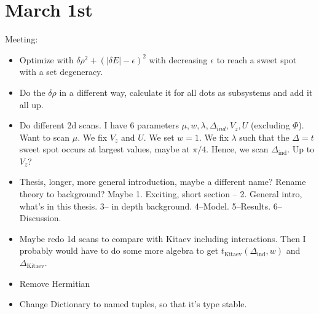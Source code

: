 \documentclass{article}
\begin{document}
\section*{March 1st}
Meeting:
\begin{itemize}
    \item Optimize with $\delta\rho^2 + (|\delta E| - \epsilon)^2$ with decreasing $\epsilon$ to reach a sweet spot with a set degeneracy.
    \item Do the $\delta\rho$ in a different way, calculate it for all dots as subsystems and add it all up.
    \item Do different 2d scans. I have 6 parameters $\mu, w, \lambda, \Delta_{ind}, V_z, U$ (excluding $\Phi$). Want to scan $\mu$. We fix $V_z$ and $U$. We set $w=1$. We fix $\lambda$ such that the $\Delta=t$ sweet spot occurs at largest values, maybe at $\pi/4$. Hence, we scan $\Delta_\text{ind}$. Up to $V_z$?
    \item Thesis, longer, more general introduction, maybe a different name? Rename theory to background? Maybe 1. Exciting, short section -- 2. General intro, what's in this thesis. 3-- in depth background. 4--Model. 5--Results. 6--Discussion.
    \item Maybe redo 1d scans to compare with Kitaev including interactions. Then I probably would have to do some more algebra to get $t_\text{Kitaev}(\Delta_\text{ind}, w)$ and $\Delta_\text{Kitaev}$. 
    \item Remove Hermitian
    \item Change Dictionary to named tuples, so that it's type stable.
\end{itemize}
\end{document}
